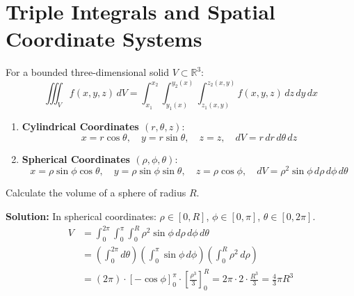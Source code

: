 \section{Triple Integrals and Spatial Coordinate Systems}
For a bounded three-dimensional solid $V \subset \mathbb{R}^3$:
\begin{equation}
\iiint_V f(x,y,z) \, dV = \int_{x_1}^{x_2} \int_{y_1(x)}^{y_2(x)} \int_{z_1(x,y)}^{z_2(x,y)} f(x,y,z) \, dz \, dy \, dx
\end{equation}

\begin{theorem}
\begin{enumerate}
    \item \textbf{Cylindrical Coordinates $(r, \theta, z)$}:
    \begin{equation}
    x = r\cos\theta, \quad y = r\sin\theta, \quad z = z, \quad dV = r \, dr \, d\theta \, dz
    \end{equation}
    \item \textbf{Spherical Coordinates $(\rho, \phi, \theta)$}:
    \begin{equation}
    x = \rho \sin\phi \cos\theta, \quad y = \rho \sin\phi \sin\theta, \quad z = \rho \cos\phi, \quad dV = \rho^2 \sin\phi \, d\rho \, d\phi \, d\theta
    \end{equation}
\end{enumerate}
\end{theorem}

\begin{example}
Calculate the volume of a sphere of radius $R$.

\textbf{Solution:}
In spherical coordinates: $\rho \in [0, R]$, $\phi \in [0, \pi]$, $\theta \in [0, 2\pi]$.
\begin{align*}
V &= \int_0^{2\pi} \int_0^{\pi} \int_0^R \rho^2 \sin\phi \, d\rho \, d\phi \, d\theta \\
  &= \left( \int_0^{2\pi} d\theta \right) \left( \int_0^{\pi} \sin\phi \, d\phi \right) \left( \int_0^R \rho^2 \, d\rho \right) \\
  &= (2\pi) \cdot [-\cos\phi]_0^{\pi} \cdot \left[ \frac{\rho^3}{3} \right]_0^R = 2\pi \cdot 2 \cdot \frac{R^3}{3} = \frac{4}{3}\pi R^3
\end{align*}
\end{example}
